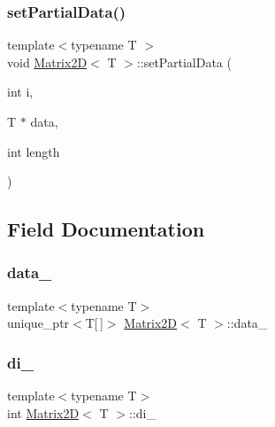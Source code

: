 \mbox{\label{classMatrix2D_a4c959b3c3807e9ca4d8d62f3e516b933_a4c959b3c3807e9ca4d8d62f3e516b933}} 
\subsubsection{\texorpdfstring{set\+Partial\+Data()}{setPartialData()}}
{\footnotesize\ttfamily template$<$typename T $>$ \\
void \mbox{\hyperlink{classMatrix2D}{Matrix2D}}$<$ T $>$\+::set\+Partial\+Data (\begin{DoxyParamCaption}\item[{int}]{i,  }\item[{T $\ast$}]{data,  }\item[{int}]{length }\end{DoxyParamCaption})}



\subsection{Field Documentation}
\mbox{\label{classMatrix2D_af6db5a4e311ea727f52f16a7fb15a055_af6db5a4e311ea727f52f16a7fb15a055}} 
\subsubsection{\texorpdfstring{data\+\_\+}{data\_}}
{\footnotesize\ttfamily template$<$typename T$>$ \\
unique\+\_\+ptr$<$T\mbox{[}$\,$\mbox{]}$>$ \mbox{\hyperlink{classMatrix2D}{Matrix2D}}$<$ T $>$\+::data\+\_\+\hspace{0.3cm}{\ttfamily [private]}}

\mbox{\label{classMatrix2D_ad9c316f4e27753ab30164f90f9dfaee9_ad9c316f4e27753ab30164f90f9dfaee9}} 
\subsubsection{\texorpdfstring{di\+\_\+}{di\_}}
{\footnotesize\ttfamily template$<$typename T$>$ \\
int \mbox{\hyperlink{classMatrix2D}{Matrix2D}}$<$ T $>$\+::di\+\_\+\hspace{0.3cm}{\ttfamily [private]}}

